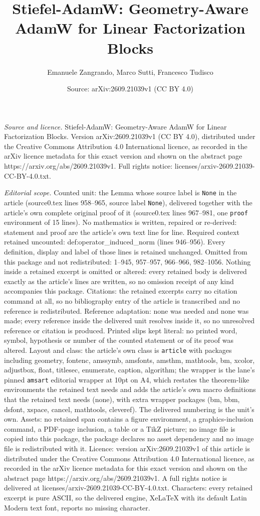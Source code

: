 \documentclass[10pt,a4paper]{amsart}
\title[Stiefel-AdamW: Geometry-Aware AdamW for Linear Factorization]{Stiefel-AdamW: Geometry-Aware AdamW for Linear Factorization Blocks}
\author{Emanuele Zangrando, Marco Sutti, Francesco Tudisco}
\date{Source: arXiv:2609.21039v1 (CC BY 4.0)}
\begin{document}
\maketitle

\noindent\emph{Source and licence.} Stiefel-AdamW: Geometry-Aware AdamW for Linear Factorization Blocks. Version arXiv:2609.21039v1 (CC BY 4.0), distributed under the Creative Commons Attribution 4.0 International licence, as recorded in the arXiv licence metadata for this exact version and shown on the abstract page https://arxiv.org/abs/2609.21039v1. Full rights notice: licenses/arxiv-2609.21039-CC-BY-4.0.txt.\par\smallskip

\noindent\textit{Editorial scope.} Counted unit: the Lemma whose source label is \texttt{None} in the article (source0.tex lines 958--965, source label \texttt{None}), delivered together with the article's own complete original proof of it (source0.tex lines 967--981, one \texttt{proof} environment of 15 lines). No mathematics is written, repaired or re-derived: statement and proof are the article's own text line for line. Required context retained uncounted: def:operator\_induced\_norm (lines 946--956). Every definition, display and label of those lines is retained unchanged. Omitted from this package and not redistributed: 1--945, 957--957, 966--966, 982--1056. Nothing inside a retained excerpt is omitted or altered: every retained body is delivered exactly as the article's lines are written, so no omission receipt of any kind accompanies this package. Citations: the retained excerpts carry no citation command at all, so no bibliography entry of the article is transcribed and no reference is redistributed. Reference adaptation: none was needed and none was made; every reference inside the delivered unit resolves inside it, so no unresolved reference or citation is produced. Printed slips kept literal: no printed word, symbol, hypothesis or number of the counted statement or of its proof was altered. Layout and class: the article's own class is \texttt{article} with packages including geometry, fontenc, amssymb, amsfonts, amsthm, mathtools, bm, xcolor, adjustbox, float, titlesec, enumerate, caption, algorithm; the wrapper is the lane's pinned \texttt{amsart} editorial wrapper at 10pt on A4, which restates the theorem-like environments the retained text needs and adds the article's own macro definitions that the retained text needs (none), with extra wrapper packages (bm, bbm, dsfont, xspace, cancel, mathtools, cleveref). The delivered numbering is the unit's own. Assets: no retained span contains a figure environment, a graphics-inclusion command, a PDF-page inclusion, a table or a TikZ picture; no image file is copied into this package, the package declares no asset dependency and no image file is redistributed with it. Licence: version arXiv:2609.21039v1 of this article is distributed under the Creative Commons Attribution 4.0 International licence, as recorded in the arXiv licence metadata for this exact version and shown on the abstract page https://arxiv.org/abs/2609.21039v1. A full rights notice is delivered at licenses/arxiv-2609.21039-CC-BY-4.0.txt. Characters: every retained excerpt is pure ASCII, so the delivered engine, XeLaTeX with its default Latin Modern text font, reports no missing character.
\end{document}
